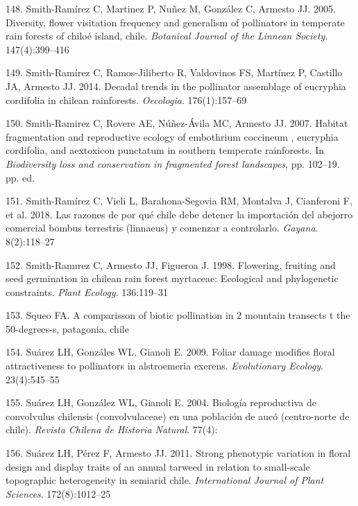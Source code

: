 \documentclass[
]{article}
\begin{document}
\leavevmode\hypertarget{ref-RN74}{}%
148. Smith-Ramírez C, Martinez P, Nuñez M, González C, Armesto JJ. 2005.
Diversity, flower visitation frequency and generalism of pollinators in
temperate rain forests of chiloé island, chile. \emph{Botanical Journal
of the Linnean Society}. 147(4):399--416

\leavevmode\hypertarget{ref-RN75}{}%
149. Smith-Ramírez C, Ramos-Jiliberto R, Valdovinos FS, Martínez P,
Castillo JA, Armesto JJ. 2014. Decadal trends in the pollinator
assemblage of eucryphia cordifolia in chilean rainforests.
\emph{Oecologia}. 176(1):157--69

\leavevmode\hypertarget{ref-RN97}{}%
150. Smith-Ramirez C, Rovere AE, Núñez-Ávila MC, Armesto JJ. 2007.
Habitat fragmentation and reproductive ecology of embothrium coccineum ,
eucryphia cordifolia, and aextoxicon punctatum in southern temperate
rainforests. In \emph{Biodiversity loss and conservation in fragmented
forest landscapes}, pp. 102--19. pp. ed.

\leavevmode\hypertarget{ref-RN68}{}%
151. Smith-Ramírez C, Vieli L, Barahona-Segovia RM, Montalva J,
Cianferoni F, et al. 2018. Las razones de por qué chile debe detener la
importación del abejorro comercial bombus terrestris (linnaeus) y
comenzar a controlarlo. \emph{Gayana}. 8(2):118--27

\leavevmode\hypertarget{ref-RN73}{}%
152. Smith-Ramırez C, Armesto JJ, Figueroa J. 1998. Flowering, fruiting
and seed germination in chilean rain forest myrtaceae: Ecological and
phylogenetic constraints. \emph{Plant Ecology}. 136:119--31

\leavevmode\hypertarget{ref-RN99}{}%
153. Squeo FA. A comparisson of biotic pollination in 2 mountain
transects t the 50-degrees-s, patagonia, chile

\leavevmode\hypertarget{ref-RN156}{}%
154. Suárez LH, Gonzáles WL, Gianoli E. 2009. Foliar damage modifies
floral attractiveness to pollinators in alstroemeria exerens.
\emph{Evolutionary Ecology}. 23(4):545--55

\leavevmode\hypertarget{ref-RN76}{}%
155. Suárez LH, González WL, Gianoli E. 2004. Biología reproductiva de
convolvulus chilensis (convolvulaceae) en una población de aucó
(centro-norte de chile). \emph{Revista Chilena de Historia Natural}.
77(4):

\leavevmode\hypertarget{ref-RN157}{}%
156. Suárez LH, Pérez F, Armesto JJ. 2011. Strong phenotypic variation
in floral design and display traits of an annual tarweed in relation to
small-scale topographic heterogeneity in semiarid chile.
\emph{International Journal of Plant Sciences}. 172(8):1012--25
\end{document}
